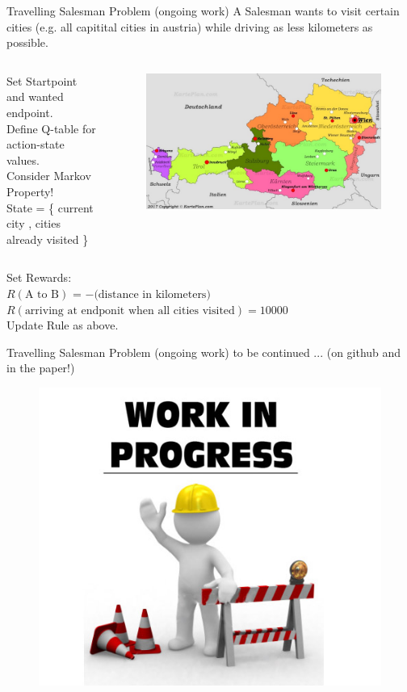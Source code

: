 \documentclass{beamer}
\begin{document}
\begin{frame}{Travelling Salesman Problem (ongoing work)}
	A Salesman wants to visit certain cities (e.g. all capitital cities in austria) while driving as less kilometers as possible. \\
	\begin{columns}
	Set Startpoint and wanted endpoint.\\
	Define Q-table for action-state values.\\
	Consider Markov Property! \\State = \{ current city , cities already visited \}\\
	\begin{figure}
	\centering
	\includegraphics[width=\linewidth]{Images/osterreich.jpg}	
	\end{figure}
	\end{columns}
	Set Rewards:\\
	\hspace{1cm}$R(\text{A to B})$ = $- \text{(distance in kilometers)}$\\
	\hspace{1cm}$R(\text{arriving at endponit when all cities visited}) = 10000$\\
	Update Rule as above.	
\end{frame}

\begin{frame}{Travelling Salesman Problem (ongoing work)}
to be continued ... (on github and in the paper!) \\
\vspace{1 cm}
\begin{figure}
\centering
\includegraphics[width=0.4\linewidth]{Images/WORK-IN-PROGRESS.jpg}	
\end{figure}
\end{frame}
\end{document}
